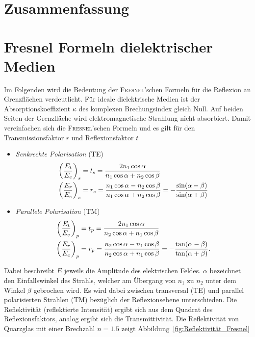 \documentclass[a4paper,twoside,final]{article}
\begin{document}
\FloatBarrier
\newpage
\section{Zusammenfassung}

\appendix
\section{Fresnel Formeln dielektrischer Medien}
Im Folgenden wird die Bedeutung der \textsc{Fresnel}'schen Formeln für die Reflexion an Grenzflächen verdeutlicht. Für ideale dielektrische Medien ist der Absorptionskoeffizient $\kappa$ des komplexen Brechungsindex gleich Null. Auf beiden Seiten der Grenzfläche wird elektromagnetische Strahlung nicht absorbiert. Damit vereinfachen sich die \textsc{Fresnel}'schen Formeln und es gilt für den Transmissionsfaktor $r$ und Reflexionsfaktor $t$~\cite{Demtröder2}
\begin{itemize}
  \item \emph{Senkrechte Polarisation} (TE)
  \begin{align}
    \qty(\frac{E_t}{E_e})_s &= t_s = \frac{2 n_1 \cos \alpha}{n_1 \cos\alpha + n_2 \cos \beta}\\
    \qty(\frac{E_r}{E_e})_s &= r_s = \frac{n_1 \cos\alpha - n_2 \cos\beta}{n_1 \cos\alpha + n_2 \cos \beta} = -\frac{\sin(\alpha -\beta)}{\sin(\alpha + \beta)}
  \end{align}
  \item \emph{Parallele Polarisation} (TM)
  \begin{align}
    \qty(\frac{E_t}{E_e})_p &= t_p = \frac{2 n_1 \cos \alpha}{n_2 \cos\alpha + n_1 \cos \beta}\\
    \qty(\frac{E_r}{E_e})_p &= r_p = \frac{n_2 \cos\alpha - n_1 \cos\beta}{n_2 \cos\alpha + n_1 \cos \beta} = -\frac{\tan(\alpha -\beta)}{\tan(\alpha + \beta)}.\label{eqn:Parallele_Polarisation}
  \end{align}
\end{itemize}
Dabei beschreibt $E$ jeweils die Amplitude des elektrischen Feldes. $\alpha$ bezeichnet den Einfallswinkel des Strahls, welcher am Übergang von $n_1$ zu $n_2$ unter dem Winkel $\beta$ gebrochen wird.
Es wird dabei zwischen transversal (TE) und parallel polarisierten Strahlen (TM) bezüglich der Reflexionsebene unterschieden. Die Reflektivität (reflektierte Intensität) ergibt sich aus dem Quadrat des Reflexionsfaktors, analog ergibt sich die Transmittivität. Die Reflektivität von Quarzglas mit einer Brechzahl $n = 1.5$ zeigt Abbildung~\ref{fig:Reflektivität_Fresnel}
\end{document}
